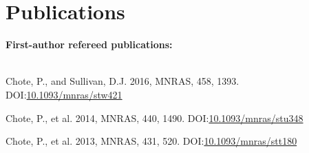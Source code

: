 \documentclass[print]{cv-style}
\begin{document}
\pagebreak

\section{Publications}
{\bf First-author refereed publications:}\\
~\vspace{-2mm}\\
\begin{entrylist}
  {\small Chote, P., and Sullivan, D.J. 2016, MNRAS, 458, 1393. \textsc{DOI:}\href{http://dx.doi.org/10.1093/mnras/stw421}{10.1093/mnras/stw421}}

  {\small Chote, P., et al. 2014, MNRAS, 440, 1490. \textsc{DOI:}\href{http://dx.doi.org/10.1093/mnras/stu348}{10.1093/mnras/stu348}}
  
  {\small Chote, P., et al. 2013, MNRAS, 431, 520. \textsc{DOI:}\href{http://dx.doi.org/10.1093/mnras/stt180}{10.1093/mnras/stt180}}
\end{entrylist}\\
\end{document}
